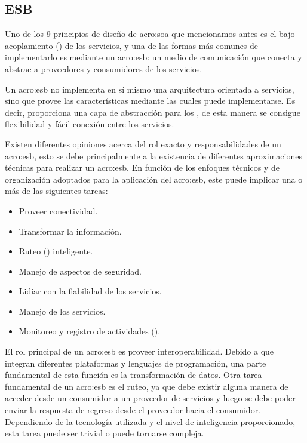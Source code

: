 
\subsection{ESB}
\label{esb:introduccion}

Uno de los 9 principios de diseño de \gls{acro:soa} que mencionamos antes es el bajo acoplamiento () de los servicios, y una de las formas más comunes de implementarlo es mediante un \gls{acro:esb}: un medio de comunicación que conecta y abstrae a proveedores y consumidores de los servicios.

Un \gls{acro:esb} no implementa en sí mismo una arquitectura orientada a servicios, sino que provee las características mediante las cuales puede implementarse. Es decir, proporciona una capa de abstracción para los , de esta manera se consigue flexibilidad y fácil conexión entre los servicios.

Existen diferentes opiniones acerca del rol exacto y responsabilidades de un \gls{acro:esb}, esto se debe principalmente a la existencia de diferentes aproximaciones técnicas para realizar un \gls{acro:esb}\cite[p.~47]{josuttis2007}.  En función de los enfoques técnicos y de organización adoptados para la aplicación del \gls{acro:esb}, este puede implicar una o más de las siguientes tareas:

\begin{itemize}
  \item Proveer conectividad.
  \item Transformar la información.
  \item Ruteo () inteligente.
  \item Manejo de aspectos de seguridad.
  \item Lidiar con la fiabilidad de los servicios.
  \item Manejo de los servicios.
  \item Monitoreo y registro de actividades ().
\end{itemize}

El rol principal de un \gls{acro:esb} es proveer interoperabilidad. Debido a que integran diferentes plataformas y lenguajes de programación, una parte fundamental de esta función es la transformación de datos.
Otra tarea fundamental de un \gls{acro:esb} es el ruteo, ya que debe existir alguna manera de acceder desde un consumidor a un proveedor de servicios y luego se debe poder enviar la respuesta de regreso desde el proveedor hacia el consumidor. Dependiendo de la tecnología utilizada y el nivel de inteligencia proporcionado, esta tarea puede ser trivial o puede tornarse compleja.

